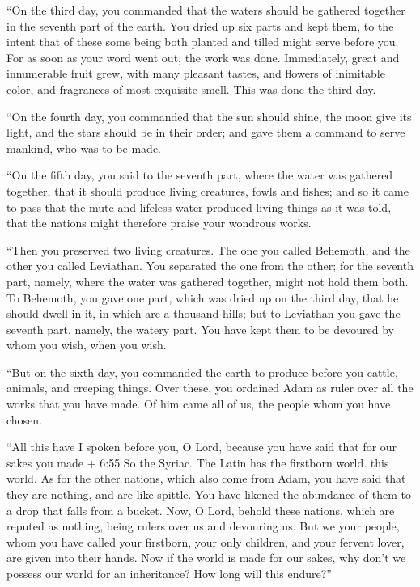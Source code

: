  ``On the third day, you commanded that the waters should
be gathered together in the seventh part of the earth. You dried up six
parts and kept them, to the intent that of these some being both planted
and tilled might serve before you.  For as soon as your
word went out, the work was done.  Immediately, great and
innumerable fruit grew, with many pleasant tastes, and flowers of
inimitable color, and fragrances of most exquisite smell. This was done
the third day.

 ``On the fourth day, you commanded that the sun should
shine, the moon give its light, and the stars should be in their order;
 and gave them a command to serve mankind, who was to be
made.

 ``On the fifth day, you said to the seventh part, where
the water was gathered together, that it should produce living
creatures, fowls and fishes; and so it came to pass  that
the mute and lifeless water produced living things as it was told, that
the nations might therefore praise your wondrous works.

 ``Then you preserved two living creatures. The one you
called Behemoth, and the other you called Leviathan.  You
separated the one from the other; for the seventh part, namely, where
the water was gathered together, might not hold them both. 
To Behemoth, you gave one part, which was dried up on the third day,
that he should dwell in it, in which are a thousand hills; 
but to Leviathan you gave the seventh part, namely, the watery part. You
have kept them to be devoured by whom you wish, when you wish.

 ``But on the sixth day, you commanded the earth to produce
before you cattle, animals, and creeping things.  Over
these, you ordained Adam as ruler over all the works that you have made.
Of him came all of us, the people whom you have chosen.

 ``All this have I spoken before you, O Lord, because you
have said that for our sakes you made + 6:55 So the Syriac. The Latin
has the firstborn world. this world.  As for the other
nations, which also come from Adam, you have said that they are nothing,
and are like spittle. You have likened the abundance of them to a drop
that falls from a bucket.  Now, O Lord, behold these
nations, which are reputed as nothing, being rulers over us and
devouring us.  But we your people, whom you have called
your firstborn, your only children, and your fervent lover, are given
into their hands.  Now if the world is made for our sakes,
why don't we possess our world for an inheritance? How long will this
endure?''

